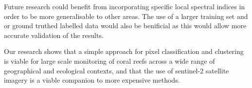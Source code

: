 \documentclass[journal,article,submit,pdftex,moreauthors]{Definitions/mdpi}
\begin{document}
Future research could benefit from incorporating specific local spectral indices in order to be more generalisable to other areas. The use of a larger training set and or ground truthed labelled data would also be benificial as this would allow more accurate validation of the results. 

Our research shows that a simple approach for pixel classification and clustering is viable for large scale monitoring of coral reefs across a wide range of geographical and ecological contexts, and that the use of sentinel-2 satellite imagery is a viable companion to more expensive methods.


\vspace{6pt} 



\end{document}
